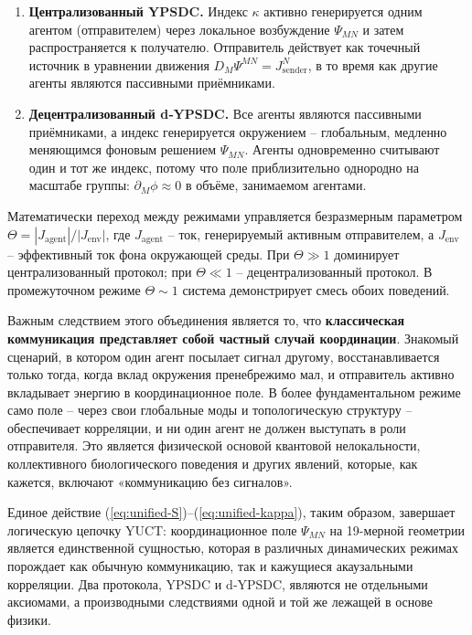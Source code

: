 \documentclass[11pt,a4paper]{article}
\begin{document}
	\begin{enumerate}[leftmargin=*, label=\textbf{(\arabic*)}]
		\item \textbf{Централизованный YPSDC.} Индекс \(\kappa\) активно генерируется
		одним агентом (отправителем) через локальное возбуждение \(\Psi_{MN}\) и затем
		распространяется к получателю. Отправитель действует как точечный источник в
		уравнении движения \(D_M\Psi^{MN} = J^{N}_{\mathrm{sender}}\), в то время как другие
		агенты являются пассивными приёмниками.
		\item \textbf{Децентрализованный d‑YPSDC.} Все агенты являются пассивными приёмниками, а
		индекс генерируется окружением – глобальным, медленно меняющимся
		фоновым решением \(\Psi_{MN}\). Агенты одновременно считывают один и тот же
		индекс, потому что поле приблизительно однородно на масштабе группы: \(\partial_M\phi \approx 0\) в объёме, занимаемом агентами.
	\end{enumerate}
	
	Математически переход между режимами управляется безразмерным
	параметром \(\Theta = |J_{\mathrm{agent}}| / |J_{\mathrm{env}}|\), где
	\(J_{\mathrm{agent}}\) – ток, генерируемый активным отправителем, а
	\(J_{\mathrm{env}}\) – эффективный ток фона окружающей среды.
	При \(\Theta \gg 1\) доминирует централизованный протокол; при \(\Theta \ll 1\) –
	децентрализованный протокол. В промежуточном режиме
	\(\Theta \sim 1\) система демонстрирует смесь обоих поведений.
	
	Важным следствием этого объединения является то, что \textbf{классическая
		коммуникация представляет собой частный случай координации}. Знакомый сценарий, в котором
	один агент посылает сигнал другому, восстанавливается только тогда, когда вклад окружения
	пренебрежимо мал, и отправитель активно вкладывает энергию в
	координационное поле. В более фундаментальном режиме само поле – через
	свои глобальные моды и топологическую структуру – обеспечивает корреляции, и ни один
	агент не должен выступать в роли отправителя. Это является физической основой квантовой
	нелокальности, коллективного биологического поведения и других явлений, которые, как кажется,
	включают «коммуникацию без сигналов».
	
	Единое действие (\ref{eq:unified-S})–(\ref{eq:unified-kappa}), таким образом,
	завершает логическую цепочку YUCT: координационное поле \(\Psi_{MN}\) на
	19-мерной геометрии является единственной сущностью, которая в различных динамических
	режимах порождает как обычную коммуникацию, так и кажущиеся акаузальными
	корреляции. Два протокола, YPSDC и d‑YPSDC, являются не отдельными аксиомами,
	а производными следствиями одной и той же лежащей в основе физики.
	
\end{document}

